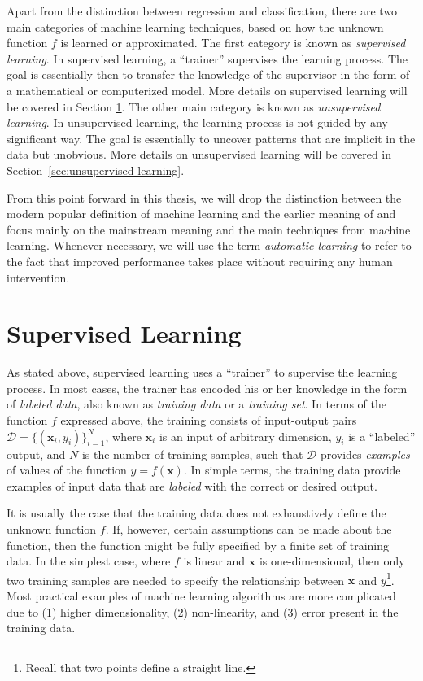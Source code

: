Apart from the distinction between regression and classification, there are two main categories of machine learning techniques, based on how the unknown function $f$ is learned or approximated. The first category is known as \emph{supervised learning}. In supervised learning, a ``trainer'' supervises the learning process. The goal is essentially then to transfer the knowledge of the supervisor in the form of a mathematical or computerized model. More details on supervised learning will be covered in Section \ref{sec:supervised-learning}. The other main category is known as \emph{unsupervised learning}. In unsupervised learning, the learning process is not guided by any significant way. The goal is essentially to uncover patterns that are implicit in the data but unobvious.   More details on unsupervised learning will be covered in Section~\ref{sec:unsupervised-learning}.

From this point forward in this thesis, we will drop the distinction between the modern popular definition of machine learning and the earlier meaning of \cite{Mitchell1990} and focus mainly on the mainstream meaning and the main techniques from machine learning. Whenever necessary, we will use the term \emph{automatic learning} to refer to the fact that improved performance takes place without requiring any human intervention.
%
\section{Supervised Learning}
\label{sec:supervised-learning}
%
As stated above, supervised learning uses a ``trainer'' to supervise the learning process. In most cases, the trainer has encoded his or her knowledge in the form of \emph{labeled data}, also known as \emph{training data} or a \emph{training set}. In terms of the function $f$ expressed above, the training consists of input-output pairs $\mathcal{D} = \{(\mathbf{x}_i, y_i)\}_{i=1}^N $, where $\mathbf{x}_i$ is an input of arbitrary dimension, $y_i$ is a ``labeled'' output, and $N$ is the number of training samples, such that $\mathcal{D}$ provides \emph{examples} of values of the function $y = f(\mathbf{x})$. In simple terms, the training data provide examples of input data that are \emph{labeled} with the correct or desired output.

It is usually the case that the training data does not exhaustively define the unknown function $f$. If, however, certain assumptions can be made about the function, then the function might be fully specified by a finite set of training data. In the simplest case, where $f$ is linear and $\mathbf{x}$ is one-dimensional, then only two training samples are needed to specify the relationship between $\mathbf{x}$ and $y$\footnote{Recall that two points define a straight line.}. Most practical examples of machine learning algorithms are more complicated due to (1) higher dimensionality, (2) non-linearity, and (3) error present in the training data.

